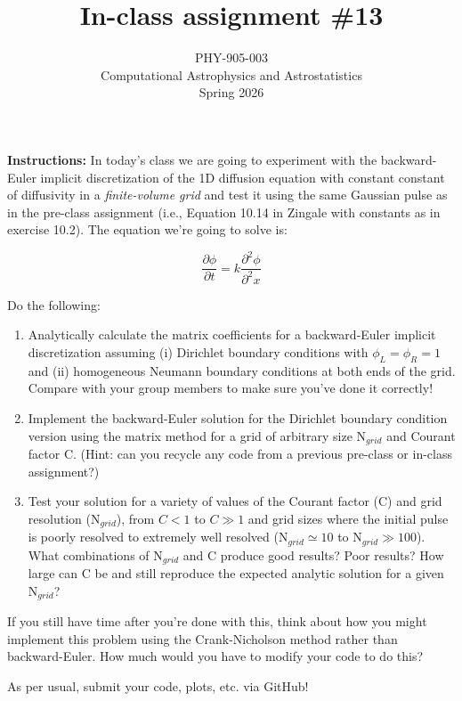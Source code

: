 \documentclass[10pt]{article}
\title{In-class assignment \#13}
\author{PHY-905-003\\Computational Astrophysics and
  Astrostatistics\\Spring 2026}
\date{} %
\begin{document}
 
\maketitle

\vspace{-5mm}


\noindent \textbf{Instructions:} In today's class we are going to
experiment with the backward-Euler implicit discretization of the 1D
diffusion equation with constant constant of diffusivity in a
\textit{finite-volume grid} and test it using the same Gaussian pulse
as in the pre-class assignment (i.e., Equation 10.14 in Zingale with
constants as in exercise 10.2).  The equation we're going to solve is:

\begin{equation}
\frac{\partial \phi}{\partial t} = k \frac{\partial^2 \phi}{\partial^2 x}
\end{equation}

\noindent Do the following:

\begin{enumerate}

\item Analytically calculate the matrix coefficients for a
backward-Euler implicit discretization assuming (i) Dirichlet boundary
conditions with $\phi_L = \phi_R = 1$ and (ii) homogeneous Neumann
boundary conditions at both ends of the grid.  Compare with your group
members to make sure you've
done it correctly!

\item Implement the backward-Euler solution for the Dirichlet boundary
condition version using the matrix method for a grid of arbitrary size
N$_{grid}$ and Courant factor C.  (Hint: can you recycle any code from
a previous pre-class or in-class assignment?)

\item Test your solution for a variety of values of the Courant factor
(C) and grid resolution (N$_{grid}$), from $C < 1$ to $C \gg 1$ and
grid sizes where the initial pulse is poorly resolved to extremely
well resolved (N$_{grid} \simeq 10$ to N$_{grid} \gg 100$).  What combinations of N$_{grid}$ and C produce good
results?  Poor results?  How large can C be and still reproduce the
expected analytic solution for a given N$_{grid}$?

\end{enumerate}

\noindent 
If you still have time after you're done with this, think about how
you might implement this problem using the Crank-Nicholson method
rather than backward-Euler.  How much would you have to modify your
code to do this?

\vspace{5mm}
\noindent
As per usual, submit your code, plots, etc. via GitHub!
\end{document}
